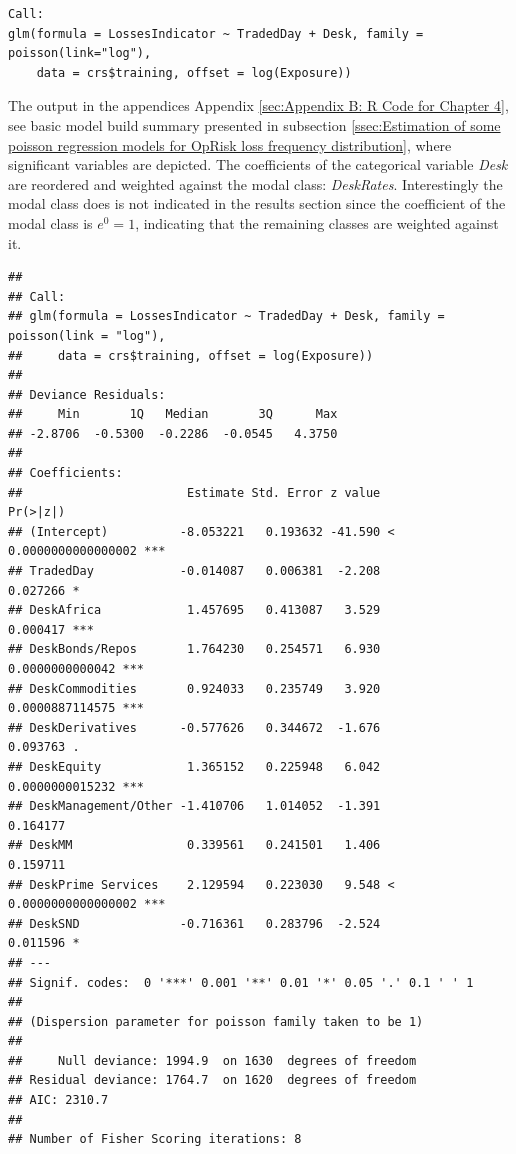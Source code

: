 \documentclass{DissertateUSU}
\begin{document}
\singlespacing

\doublespacing

\singlespacing
\begin{verbatim}
Call:
glm(formula = LossesIndicator ~ TradedDay + Desk, family = poisson(link="log"), 
    data = crs$training, offset = log(Exposure))

\end{verbatim}
\doublespacing

The output in the appendices Appendix
\ref{sec:Appendix B: R Code for Chapter 4}, see basic model build
summary presented in subsection
\ref{ssec:Estimation of some poisson regression models for OpRisk loss frequency distribution},
where significant variables are depicted. The coefficients of the
categorical variable \emph{Desk} are reordered and weighted against the
modal class: \emph{DeskRates}. Interestingly the modal class does is not
indicated in the results section since the coefficient of the modal
class is \(e^0 = 1\), indicating that the remaining classes are weighted
against it.

\singlespacing

\begin{verbatim}
## 
## Call:
## glm(formula = LossesIndicator ~ TradedDay + Desk, family = poisson(link = "log"), 
##     data = crs$training, offset = log(Exposure))
## 
## Deviance Residuals: 
##     Min       1Q   Median       3Q      Max  
## -2.8706  -0.5300  -0.2286  -0.0545   4.3750  
## 
## Coefficients:
##                       Estimate Std. Error z value             Pr(>|z|)    
## (Intercept)          -8.053221   0.193632 -41.590 < 0.0000000000000002 ***
## TradedDay            -0.014087   0.006381  -2.208             0.027266 *  
## DeskAfrica            1.457695   0.413087   3.529             0.000417 ***
## DeskBonds/Repos       1.764230   0.254571   6.930      0.0000000000042 ***
## DeskCommodities       0.924033   0.235749   3.920      0.0000887114575 ***
## DeskDerivatives      -0.577626   0.344672  -1.676             0.093763 .  
## DeskEquity            1.365152   0.225948   6.042      0.0000000015232 ***
## DeskManagement/Other -1.410706   1.014052  -1.391             0.164177    
## DeskMM                0.339561   0.241501   1.406             0.159711    
## DeskPrime Services    2.129594   0.223030   9.548 < 0.0000000000000002 ***
## DeskSND              -0.716361   0.283796  -2.524             0.011596 *  
## ---
## Signif. codes:  0 '***' 0.001 '**' 0.01 '*' 0.05 '.' 0.1 ' ' 1
## 
## (Dispersion parameter for poisson family taken to be 1)
## 
##     Null deviance: 1994.9  on 1630  degrees of freedom
## Residual deviance: 1764.7  on 1620  degrees of freedom
## AIC: 2310.7
## 
## Number of Fisher Scoring iterations: 8
\end{verbatim}
\end{document}

